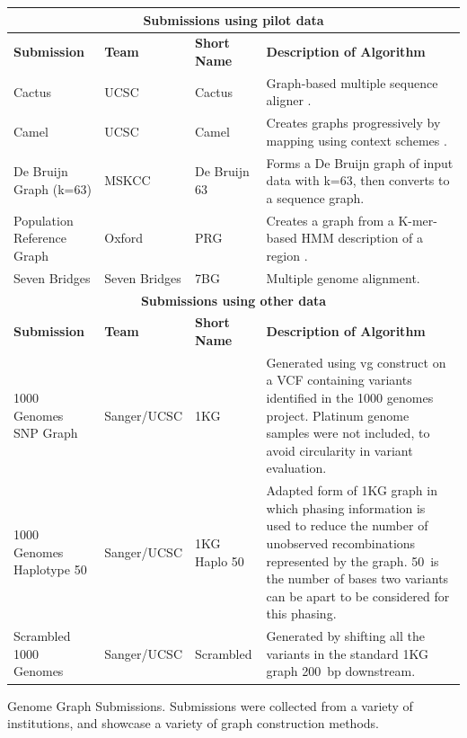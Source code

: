 \begin{FPtable}
  \centering
  {\small
  \begin{tabular}{p{2cm}p{1.5cm}p{1.5cm}p{5cm}}
  \hline
  \multicolumn{4}{c}{\textbf{Submissions using pilot data}}
  \\
  \hline
  \textbf{Submission} & \textbf{Team} & \textbf{Short Name} & \textbf{Description of Algorithm}
  \\
  \hline
  Cactus & UCSC & Cactus & Graph-based multiple sequence aligner \cite{paten2011cactus2}.
  \\
  Camel & UCSC & Camel & Creates graphs progressively by mapping using
  context schemes \cite{novak2015canonical}.
  \\
  De Bruijn Graph (k=63) & MSKCC & De Bruijn 63 & Forms a De Bruijn graph
  of input data with k=63, then converts to a sequence graph.
  \\
  Population Reference Graph & Oxford & PRG & Creates a graph from a
  K-mer-based HMM description of a region \cite{dilthey2015improved}.
  \\
  Seven Bridges & Seven Bridges & 7BG & Multiple genome alignment.
  \\
  \hline
  \multicolumn{4}{c}{\textbf{Submissions using other data}}
  \\
  \hline
  \textbf{Submission} & \textbf{Team} & \textbf{Short Name} & \textbf{Description of Algorithm}
  \\
  \hline
  1000 Genomes SNP Graph & Sanger/\allowbreak UCSC & 1KG & Generated using vg
  construct on a VCF containing variants identified in the 1000 genomes
  project. Platinum genome samples were not included, to avoid circularity
  in variant evaluation.
  \\
  1000 Genomes Haplotype 50 & Sanger/\allowbreak UCSC & 1KG Haplo 50 & Adapted form of
  1KG graph in which phasing information is used to reduce the number of
  unobserved recombinations represented by the graph. 50~is the number of
  bases two variants can be apart to be considered for this phasing.
  \\
  Scrambled 1000 Genomes & Sanger/\allowbreak UCSC & Scrambled & Generated by shifting
  all the variants in the standard 1KG graph 200~bp downstream.
  \end{tabular}
  }

  \caption[Genome graph submissions]{Genome Graph Submissions. Submissions were collected from a variety of institutions, and showcase a variety of graph construction methods.}
  \label{tbl:bakeoff:graphs}
\end{FPtable}

